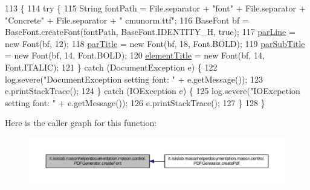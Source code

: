\begin{DoxyCode}
113                               \{
114         \textcolor{keywordflow}{try} \{
115             String fontPath = File.separator + \textcolor{stringliteral}{"font"} + File.separator + \textcolor{stringliteral}{"Concrete"} + File.separator + \textcolor{stringliteral}{"
      cmunorm.ttf"};
116             BaseFont bf = BaseFont.createFont(fontPath, BaseFont.IDENTITY\_H, \textcolor{keyword}{true});
117             \hyperlink{classit_1_1isislab_1_1masonhelperdocumentation_1_1mason_1_1control_1_1_p_d_f_generator_a4887bc031c4ee6469cf807e7cd1afca6}{parLine} = \textcolor{keyword}{new} Font(bf, 12);
118             \hyperlink{classit_1_1isislab_1_1masonhelperdocumentation_1_1mason_1_1control_1_1_p_d_f_generator_a74f4e5e2095668aa762c3c3df4325c74}{parTitle} = \textcolor{keyword}{new} Font(bf, 18, Font.BOLD);
119             \hyperlink{classit_1_1isislab_1_1masonhelperdocumentation_1_1mason_1_1control_1_1_p_d_f_generator_ac4f2d6c81c14b60dcddfc358b9296ee5}{parSubTitle} = \textcolor{keyword}{new} Font(bf, 14, Font.BOLD);
120             \hyperlink{classit_1_1isislab_1_1masonhelperdocumentation_1_1mason_1_1control_1_1_p_d_f_generator_aef4e775d865ce931436933184abfcafa}{elementTitle} = \textcolor{keyword}{new} Font(bf, 14, Font.ITALIC);
121         \} \textcolor{keywordflow}{catch} (DocumentException e) \{
122             log.severe(\textcolor{stringliteral}{"DocumentException setting font: "} + e.getMessage());
123             e.printStackTrace();
124         \} \textcolor{keywordflow}{catch} (IOException e) \{
125             log.severe(\textcolor{stringliteral}{"IOExcpetion setting font: "} + e.getMessage());
126             e.printStackTrace();
127         \}
128     \}
\end{DoxyCode}


Here is the caller graph for this function\-:
\nopagebreak
\begin{figure}[H]
\begin{center}
\leavevmode
\includegraphics[width=350pt]{classit_1_1isislab_1_1masonhelperdocumentation_1_1mason_1_1control_1_1_p_d_f_generator_a403097faddc3554447db07d62b3ebfda_icgraph}
\end{center}
\end{figure}


